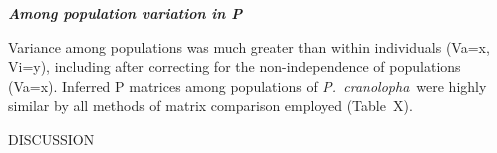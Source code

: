 \documentclass[12pt,letterpaper]{article}
\def\PC{\emph{P.~cranolopha}}
\renewcommand{\section}[1]{%
\bigskip
\begin{center}
\begin{large}
\normalfont\scshape #1
\medskip
\end{large}
\end{center}}
\renewcommand{\subsection}[1]{%
\bigskip
{\noindent \normalfont \bf \emph{#1}}
}
\begin{document}
\subsection{Among population variation in P}
Variance among populations was much greater than within individuals (Va=x, Vi=y), including after correcting for the non-independence of populations (Va=x). Inferred P matrices among populations of \PC~were highly similar by all methods of matrix comparison employed (Table~X). 


\section{DISCUSSION}

\end{document}
